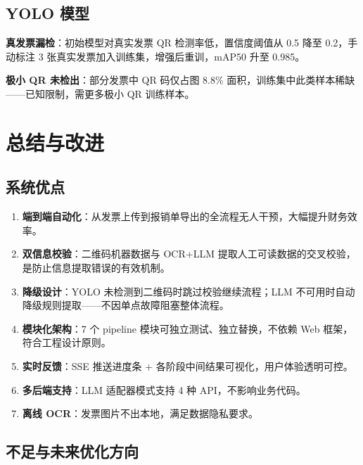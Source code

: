 \documentclass[12pt,a4paper]{ctexart}
\begin{document}
\subsection{YOLO 模型}

\textbf{真发票漏检}：初始模型对真实发票 QR 检测率低，置信度阈值从 0.5 降至 0.2，手动标注 3 张真实发票加入训练集，增强后重训，mAP50 升至 0.985。

\textbf{极小 QR 未检出}：部分发票中 QR 码仅占图 8.8\% 面积，训练集中此类样本稀缺——已知限制，需更多极小 QR 训练样本。


\section{总结与改进}

\subsection{系统优点}

\begin{enumerate}[label=(\arabic*)]
  \item \textbf{端到端自动化}：从发票上传到报销单导出的全流程无人干预，大幅提升财务效率。
  \item \textbf{双信息校验}：二维码机器数据与 OCR+LLM 提取人工可读数据的交叉校验，是防止信息提取错误的有效机制。
  \item \textbf{降级设计}：YOLO 未检测到二维码时跳过校验继续流程；LLM 不可用时自动降级规则提取——不因单点故障阻塞整体流程。
  \item \textbf{模块化架构}：7 个 pipeline 模块可独立测试、独立替换，不依赖 Web 框架，符合工程设计原则。
  \item \textbf{实时反馈}：SSE 推送进度条 + 各阶段中间结果可视化，用户体验透明可控。
  \item \textbf{多后端支持}：LLM 适配器模式支持 4 种 API，不影响业务代码。
  \item \textbf{离线 OCR}：发票图片不出本地，满足数据隐私要求。
\end{enumerate}

\subsection{不足与未来优化方向}
\end{document}
